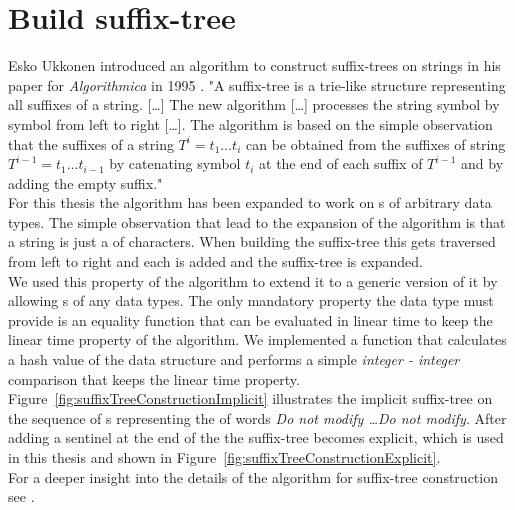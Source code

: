 \section{Build suffix-tree}
Esko Ukkonen introduced an algorithm to construct suffix-trees on strings in his paper for \textit{Algorithmica} in 1995 \cite{Ukkonen1995}. "A suffix-tree is a trie-like structure representing all suffixes of a string. [\dots] The new algorithm [\dots] processes the string symbol by symbol from left to right [\dots]. The algorithm is based on the simple observation that the suffixes of a string $T^i = t_1 \dots t_i$ can be obtained from the suffixes of string $T^{i-1} = t_1 \dots t_{i-1}$ by catenating symbol $t_i$ at the end of each suffix of $T^{i-1}$ and by adding the empty suffix."~\cite{Ukkonen1995}\\
For this thesis the algorithm has been expanded to work on s of arbitrary data types. The simple observation that lead to the expansion of the algorithm is that a string is just a  of characters. When building the suffix-tree this  gets traversed from left to right and each  is added and the suffix-tree is expanded.\\
We used this property of the algorithm to extend it to a generic version of it by allowing s of any data types. The only mandatory property the data type must provide is an equality function that can be evaluated in linear time to keep the linear time property of the algorithm. We implemented a function that calculates a hash value of the data structure and performs a simple \textit{integer - integer} comparison that keeps the linear time property.\\
Figure~\ref{fig:suffixTreeConstructionImplicit} illustrates the implicit suffix-tree on the sequence of s representing the  of words \textit{Do not modify \dots Do not modify}. After adding a sentinel at the end of the  the suffix-tree becomes explicit, which is used in this thesis and shown in Figure~\ref{fig:suffixTreeConstructionExplicit}.\\
For a deeper insight into the details of the algorithm for suffix-tree construction see \cite{Ukkonen1995}. 



